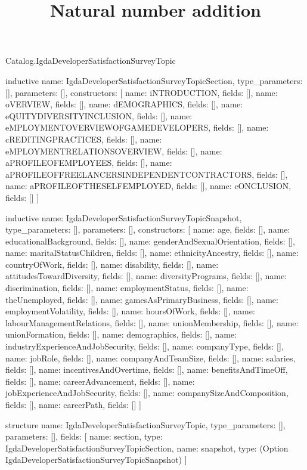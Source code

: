 \begin{lexlean}{Catalog.IgdaDeveloperSatisfactionSurveyTopic}
\title{Natural number addition}
\begin{semanticmodule}
inductive{
  name: IgdaDeveloperSatisfactionSurveyTopicSection,
  type_parameters: [],
  parameters: [],
  constructors: [
    {name: iNTRODUCTION, fields: []},
    {name: oVERVIEW, fields: []},
    {name: dEMOGRAPHICS, fields: []},
    {name: eQUITYDIVERSITYINCLUSION, fields: []},
    {name: eMPLOYMENTOVERVIEWOFGAMEDEVELOPERS, fields: []},
    {name: cREDITINGPRACTICES, fields: []},
    {name: eMPLOYMENTRELATIONSOVERVIEW, fields: []},
    {name: aPROFILEOFEMPLOYEES, fields: []},
    {name: aPROFILEOFFREELANCERSINDEPENDENTCONTRACTORS, fields: []},
    {name: aPROFILEOFTHESELFEMPLOYED, fields: []},
    {name: cONCLUSION, fields: []}
  ]
}

inductive{
  name: IgdaDeveloperSatisfactionSurveyTopicSnapshot,
  type_parameters: [],
  parameters: [],
  constructors: [
    {name: age, fields: []},
    {name: educationalBackground, fields: []},
    {name: genderAndSexualOrientation, fields: []},
    {name: maritalStatusChildren, fields: []},
    {name: ethnicityAncestry, fields: []},
    {name: countryOfWork, fields: []},
    {name: disability, fields: []},
    {name: attitudesTowardDiversity, fields: []},
    {name: diversityPrograms, fields: []},
    {name: discrimination, fields: []},
    {name: employmentStatus, fields: []},
    {name: theUnemployed, fields: []},
    {name: gamesAsPrimaryBusiness, fields: []},
    {name: employmentVolatility, fields: []},
    {name: hoursOfWork, fields: []},
    {name: labourManagementRelations, fields: []},
    {name: unionMembership, fields: []},
    {name: unionFormation, fields: []},
    {name: demographics, fields: []},
    {name: industryExperienceAndJobSecurity, fields: []},
    {name: companyType, fields: []},
    {name: jobRole, fields: []},
    {name: companyAndTeamSize, fields: []},
    {name: salaries, fields: []},
    {name: incentivesAndOvertime, fields: []},
    {name: benefitsAndTimeOff, fields: []},
    {name: careerAdvancement, fields: []},
    {name: jobExperienceAndJobSecurity, fields: []},
    {name: companySizeAndComposition, fields: []},
    {name: careerPath, fields: []}
  ]
}

structure{
  name: IgdaDeveloperSatisfactionSurveyTopic,
  type_parameters: [],
  parameters: [],
  fields: [
    {name: section, type: IgdaDeveloperSatisfactionSurveyTopicSection},
    {name: snapshot, type: (Option IgdaDeveloperSatisfactionSurveyTopicSnapshot)}
  ]
}
\end{semanticmodule}
\end{lexlean}
